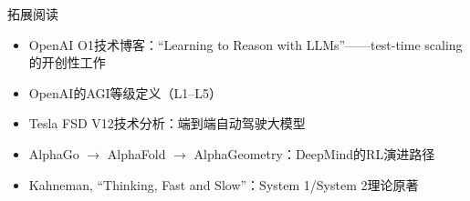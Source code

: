 \documentclass[a4paper]{article}
\begin{document}
\begin{knowledgebox}{拓展阅读}
\begin{itemize}
\item OpenAI O1技术博客：``Learning to Reason with LLMs''——test-time scaling的开创性工作
\item OpenAI的AGI等级定义（L1--L5）
\item Tesla FSD V12技术分析：端到端自动驾驶大模型
\item AlphaGo $\rightarrow$ AlphaFold $\rightarrow$ AlphaGeometry：DeepMind的RL演进路径
\item Kahneman, ``Thinking, Fast and Slow''：System 1/System 2理论原著
\end{itemize}
\end{knowledgebox}

\end{document}
